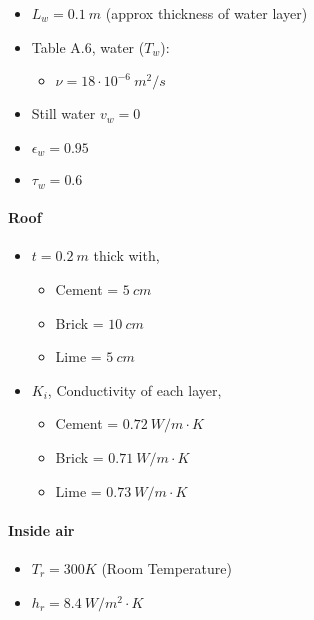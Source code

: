 \documentclass[11pt]{article}
\providecommand{\tightlist}{%
      \setlength{\itemsep}{0pt}\setlength{\parskip}{0pt}}
\begin{document}
\begin{itemize}
\tightlist
\item
  \(L_w = 0.1\ m\) (approx thickness of water layer)
\item
  Table A.6, water (\(T_w\)):

  \begin{itemize}
  \tightlist
  \item
    \(\nu = 18 \cdot 10^{-6}\ m^2/s\)
  \end{itemize}
\item
  Still water \(v_w = 0\)
\item
  \(\epsilon_w = 0.95\)
\item
  \(\tau_w=0.6\)
\end{itemize}

\hypertarget{roof}{%
\paragraph{Roof}\label{roof}}

\begin{itemize}
\tightlist
\item
  \(t = 0.2\ m\) thick with,

  \begin{itemize}
  \tightlist
  \item
    Cement = \(5\ cm\)
  \item
    Brick = \(10\ cm\)
  \item
    Lime = \(5\ cm\)
  \end{itemize}
\item
  \(K_i\), Conductivity of each layer,

  \begin{itemize}
  \tightlist
  \item
    Cement = \(0.72\ W/m\cdot K\)
  \item
    Brick = \(0.71\ W/m\cdot K\)
  \item
    Lime = \(0.73\ W/m\cdot K\)
  \end{itemize}
\end{itemize}

\hypertarget{inside-air}{%
\paragraph{Inside air}\label{inside-air}}

\begin{itemize}
\tightlist
\item
  \(T_r = 300K\) (Room Temperature)
\item
  \(h_r = 8.4\ W/m^2\cdot K\)
\end{itemize}
\end{document}
